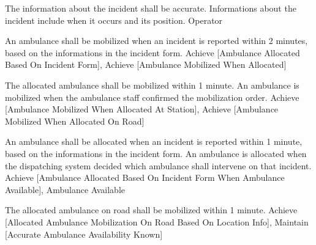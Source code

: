   
    {}
    
  \startkaosspec
  	 {The information about the incident shall be accurate. Informations about the incident include when it occurs and its position.}
  	 {Operator}
  \stopkaosspec

  \startkaosspec
  	 {An ambulance shall be mobilized when an incident is reported within 2 minutes, based on the informations in the incident form.}
  	 {Achieve [Ambulance Allocated Based On Incident Form], Achieve [Ambulance Mobilized When Allocated]}
  \stopkaosspec

  \startkaosspec
  	 {The allocated ambulance shall be mobilized within 1 minute. An ambulance is mobilized when the ambulance staff confirmed the mobilization order.}
  	 {Achieve [Ambulance Mobilized When Allocated At Station], Achieve [Ambulance Mobilized When Allocated On Road]}
  \stopkaosspec

  \startkaosspec
  	 {An ambulance shall be allocated when an incident is reported within 1 minute, based on the informations in the incident form. An ambulance is allocated when the dispatching system decided which ambulance shall intervene on that incident.}
  	 {Achieve [Ambulance Allocated Based On Incident Form When Ambulance Available], Ambulance Available}
  \stopkaosspec

  
    {}

  \startkaosspec
  	 {The allocated ambulance on road shall be mobilized within 1 minute.}
  	 {Achieve [Allocated Ambulance Mobilization On Road Based On Location Info], Maintain [Accurate Ambulance Availability Known]}
  \stopkaosspec
  

